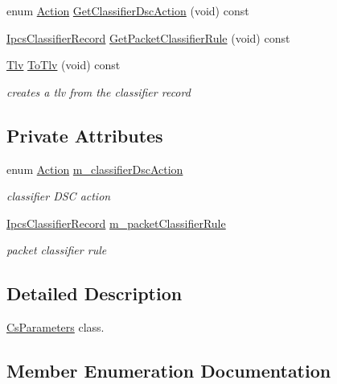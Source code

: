 \begin{DoxyCompactItemize}
enum \hyperlink{classns3_1_1CsParameters_a0d81108fb3effa0924cf6c34adabb99b}{Action} \hyperlink{classns3_1_1CsParameters_a83936bd47ea4f2d16e47b3a4dc70aff6}{Get\+Classifier\+Dsc\+Action} (void) const 
\item 
\hyperlink{classns3_1_1IpcsClassifierRecord}{Ipcs\+Classifier\+Record} \hyperlink{classns3_1_1CsParameters_a91ba1b4181f6745e3d41c6e0592e95a8}{Get\+Packet\+Classifier\+Rule} (void) const 
\item 
\hyperlink{classns3_1_1Tlv}{Tlv} \hyperlink{classns3_1_1CsParameters_a6626265aedf9a0e3f94baca3688f80b3}{To\+Tlv} (void) const 
\begin{DoxyCompactList}\small\item\em creates a tlv from the classifier record \end{DoxyCompactList}\end{DoxyCompactItemize}
\subsection*{Private Attributes}
\begin{DoxyCompactItemize}
\item 
enum \hyperlink{classns3_1_1CsParameters_a0d81108fb3effa0924cf6c34adabb99b}{Action} \hyperlink{classns3_1_1CsParameters_af0db36066ced018b75b117890cdccd27}{m\+\_\+classifier\+Dsc\+Action}
\begin{DoxyCompactList}\small\item\em classifier D\+SC action \end{DoxyCompactList}\item 
\hyperlink{classns3_1_1IpcsClassifierRecord}{Ipcs\+Classifier\+Record} \hyperlink{classns3_1_1CsParameters_ac1298c7224ec5cd77120272111c10bb2}{m\+\_\+packet\+Classifier\+Rule}
\begin{DoxyCompactList}\small\item\em packet classifier rule \end{DoxyCompactList}\end{DoxyCompactItemize}


\subsection{Detailed Description}
\hyperlink{classns3_1_1CsParameters}{Cs\+Parameters} class. 

\subsection{Member Enumeration Documentation}
